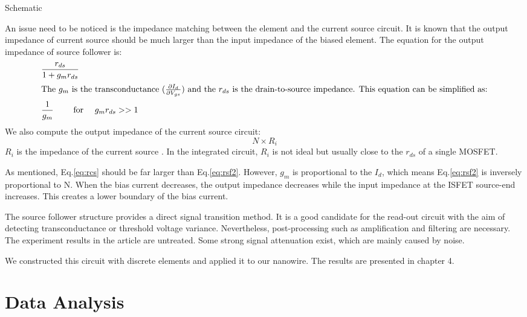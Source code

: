 {\color{red} Schematic}

An issue need to be noticed is the impedance matching between the element and the current source circuit.
It is known that the output impedance of current source should be much larger than the input impedance of the biased element.
The equation for the output impedance of source follower is:
\setlength{\mathindent}{6.5cm}
\begin{align}
    & \frac{r_{ds}}{1 + g_mr_{ds}}\\
\intertext{The $g_m$ is the transconductance ($\frac{\partial I_d}{\partial V_{gs}}$) and the $r_{ds}$ is the drain-to-source impedance.
This equation can be simplified as:}
    & \frac{1}{g_m} \qquad \text{ for } \quad g_mr_{ds} >> 1 \label{eq:rsf2}
\end{align}
We also compute the output impedance of the current source circuit:
\begin{equation} \label{eq:rcs}
    N\times R_i
\end{equation}
$R_i$ is the impedance of the current source {\color{red}{I1 in Fig}}.
In the integrated circuit, $R_i$ is not ideal but usually close to the $r_{ds}$ of a single MOSFET.

As mentioned, Eq.\ref{eq:rcs} should be far larger than Eq.\ref{eq:rsf2}.
However, $g_m$ is proportional to the $I_d$, which means Eq.\ref{eq:rsf2} is inversely proportional to N.
When the bias current decreases, the output impedance decreases while the input impedance at the ISFET source-end increases.
This creates a lower boundary of the bias current.

The source follower structure provides a direct signal transition method.
It is a good candidate for the read-out circuit with the aim of detecting transconductance or threshold voltage variance.
Nevertheless, post-processing such as amplification and filtering are necessary.
The experiment results in the article are untreated.
Some strong signal attenuation exist, which are mainly caused by noise.

We constructed this circuit with discrete elements and applied it to our nanowire. The results are presented in chapter 4.
























\section{Data Analysis}
